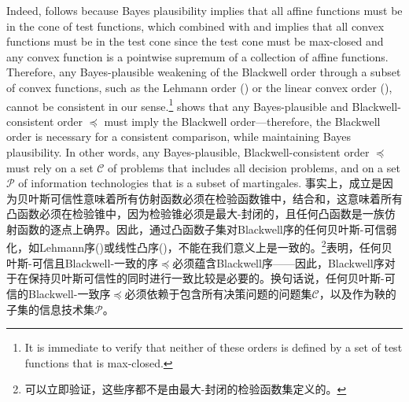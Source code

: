 \documentclass[12pt,letterpaper]{article}
\newenvironment{original}{\color{black}}{}
\newenvironment{translation}{\color{blue}}{}
\theoremstyle{plain}
\theoremstyle{definition}
\theoremstyle{remark}
\newcommand{\Pc}{\mathcal{P}}
\newcommand{\C}{\mathcal{C}}
\theoremstyle{definition}
\begin{document}
\begin{original}
Indeed,  follows because Bayes plausibility implies that all affine functions must be in the cone of test functions, which combined with  and  implies that all convex functions must be in the test cone since the test cone must be max-closed and any convex function is a pointwise supremum of a collection of affine functions. Therefore, any Bayes-plausible weakening of the Blackwell order through a subset of convex functions, such as the Lehmann order (\citealt{Lehmann}) or the linear convex order (\citealt{chen2025experiments}), cannot be consistent in our sense.\footnote{It is immediate to verify that neither of these orders is defined by a set of test functions that is max-closed.}  shows that any Bayes-plausible and Blackwell-consistent order $\preceq$ must imply the Blackwell order---therefore, the Blackwell order is necessary for a consistent comparison, while maintaining Bayes plausibility.  In other words, any Bayes-plausible, Blackwell-consistent order $\preceq$ must rely on a set $\C$ of problems that includes all decision problems, and on a set $\Pc$ of information technologies that is a subset of martingales.
\end{original}
\begin{translation}
事实上，成立是因为贝叶斯可信性意味着所有仿射函数必须在检验函数锥中，结合和，这意味着所有凸函数必须在检验锥中，因为检验锥必须是最大-封闭的，且任何凸函数是一族仿射函数的逐点上确界。因此，通过凸函数子集对Blackwell序的任何贝叶斯-可信弱化，如Lehmann序(\citealt{Lehmann})或线性凸序(\citealt{chen2025experiments})，不能在我们意义上是一致的。\footnote{可以立即验证，这些序都不是由最大-封闭的检验函数集定义的。}表明，任何贝叶斯-可信且Blackwell-一致的序$\preceq$必须蕴含Blackwell序——因此，Blackwell序对于在保持贝叶斯可信性的同时进行一致比较是必要的。换句话说，任何贝叶斯-可信的Blackwell-一致序$\preceq$必须依赖于包含所有决策问题的问题集$\C$，以及作为鞅的子集的信息技术集$\Pc$。
\end{translation}
\end{document}
